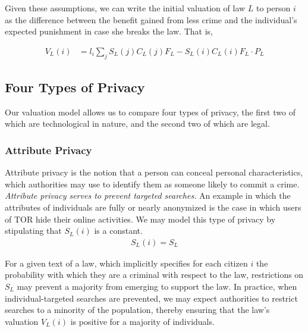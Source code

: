 Given these assumptions, we can write the initial valuation of law $L$ to person $i$ as the difference between the benefit gained from less crime and the individual's expected punishment in case she breaks the law. That is,  

\begin{align}
\label{eq:valuation}
V_L(i) &= l_i \sum_j S_L(j)C_L(j)F_L - S_L(i)C_L(i)F_L\cdot P_L 
\end{align}


\subsection{Four Types of Privacy}
Our valuation model allows us to compare four types of privacy, the first two of which are technological in nature, and the second  two of which are legal.

\subsubsection{Attribute Privacy}

Attribute privacy is the notion that a person can conceal personal characteristics, which authorities may use to identify them as someone likely to commit a crime. \emph{Attribute privacy serves to prevent targeted searches.}  An example in which the attributes of individuals are fully or nearly anonymized is the case in which users of TOR hide their online activities. We may model this type of privacy by stipulating that $S_L(i)$ is a constant.
\begin{align}
S_L(i)=S_L
\end{align}

For a given text of a law, which implicitly specifies for each citizen $i$ the probability with which they are a criminal with respect to the law, restrictions on $S_L$ %
may prevent a majority from emerging to support the law.  %
 In practice, when individual-targeted searches are prevented, we may expect authorities to restrict searches to a minority of the population, thereby ensuring that the law's valuation $V_L(i)$ is positive for a majority of individuals.

